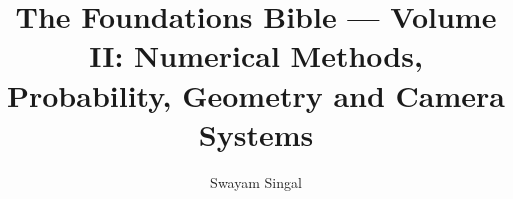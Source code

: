 \documentclass[11pt,twoside]{book}
\title{The Foundations Bible --- Volume II: Numerical Methods, Probability, Geometry and Camera Systems}
\author{Swayam Singal}
\begin{document}
\maketitle
\hypertarget{volume-reading-map}{}
\tableofcontents
\mainmatter



















\appendix
\end{document}
